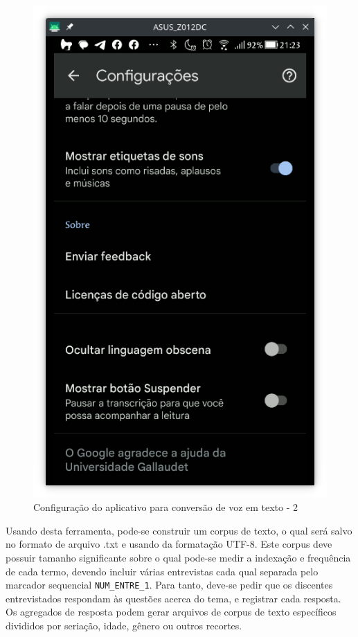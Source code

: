 \documentclass[
  12pt,       %
  openright,      %
  twoside,      %
  a4paper,      %
  english,      %
  french,       %
  spanish,      %
  brazil        %
  ]{abntex2}
\begin{document}
\begin{figure}[!htb]
\begin{minipage}{0.29\textwidth}
    \includegraphics[width=\linewidth]{android_5.png}
    \caption{Configuração do aplicativo para conversão de voz em texto - 2}
    \label{fig:imagem5}
  \end{minipage}
\end{figure}


Usando desta ferramenta, pode-se construir um corpus de texto, o qual será salvo no formato de arquivo .txt e usando da formatação UTF-8. Este corpus deve possuir tamanho significante sobre o qual pode-se medir a indexação e frequência de cada termo, devendo incluir várias entrevistas cada qual separada pelo marcador sequencial \verb|NUM_ENTRE_1|. Para tanto, deve-se pedir que os discentes entrevistados respondam às questões acerca do tema, e registrar cada resposta. Os agregados de resposta podem gerar arquivos de corpus de texto específicos divididos por seriação, idade, gênero ou outros recortes.
\end{document}
